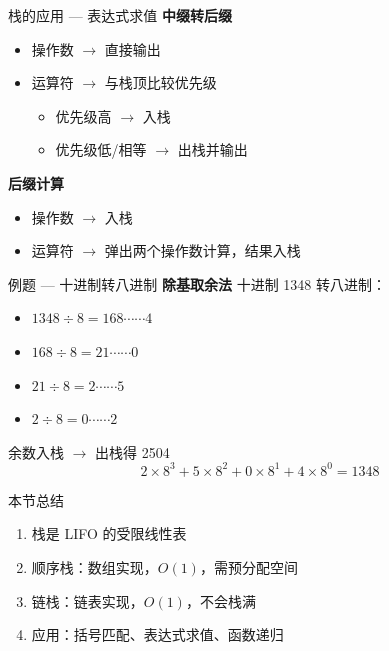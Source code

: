 \documentclass[10pt, aspectratio=169]{beamer}
\begin{document}
\begin{frame}{栈的应用 --- 表达式求值}
    \textbf{中缀转后缀}
    \begin{itemize}
        \item 操作数 $\to$ 直接输出
        \item 运算符 $\to$ 与栈顶比较优先级
        \begin{itemize}
            \item 优先级高 $\to$ 入栈
            \item 优先级低/相等 $\to$ 出栈并输出
        \end{itemize}
    \end{itemize}
    \vspace{0.5em}
    \textbf{后缀计算}
    \begin{itemize}
        \item 操作数 $\to$ 入栈
        \item 运算符 $\to$ 弹出两个操作数计算，结果入栈
    \end{itemize}
\end{frame}

\begin{frame}{例题 --- 十进制转八进制}
    \textbf{除基取余法}
    \vspace{0.5em}
    十进制 1348 转八进制：
    \begin{itemize}
        \item $1348 \div 8 = 168 \cdots\cdots 4$
        \item $168 \div 8 = 21 \cdots\cdots 0$
        \item $21 \div 8 = 2 \cdots\cdots 5$
        \item $2 \div 8 = 0 \cdots\cdots 2$
    \end{itemize}
    \vspace{0.5em}
    余数入栈 $\to$ 出栈得 2504
    \[
    2 \times 8^3 + 5 \times 8^2 + 0 \times 8^1 + 4 \times 8^0 = 1348
    \]
\end{frame}

\begin{frame}{本节总结}
    \begin{enumerate}
        \item 栈是 LIFO 的受限线性表
        \item 顺序栈：数组实现，$O(1)$，需预分配空间
        \item 链栈：链表实现，$O(1)$，不会栈满
        \item 应用：括号匹配、表达式求值、函数递归
    \end{enumerate}
\end{frame}
\end{document}
